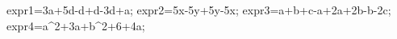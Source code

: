 \documentclass[exercice]{thedocument}%
\begin{document}
%
    \>expr1=3a+5d-d+d-3d+a;%
    \>expr2=5x-5y+5y-5x;%
    \>expr3=a+b+c-a+2a+2b-b-2c;%
    \>expr4=a^2+3a+b^2+6+4a;%
\end{document}
